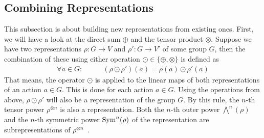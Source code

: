 \subsection{Combining Representations}

This subsection is about building new representations from existing ones.
First, we will have a look at the direct sum $\oplus$ and the tensor product $\otimes$.
Suppose we have two representations $\rho: G \to V$ and $\rho': G \to V'$ of some group $G$, then the combination of these using either operation $\odot \in \{\oplus, \otimes\}$ is defined as
\begin{align*}
    \forall a \in G: \qquad & (\rho \odot \rho')(a) = \rho(a) \odot \rho'(a)
\end{align*}
That means, the operator $\odot$ is applied to the linear maps of both representations of an action $a \in G$.
This is done for each action $a \in G$.
Using the operations from above, $\rho \odot \rho'$ will also be a representation of the group $G$.
By this rule, the $n$-th tensor power $\rho^{\otimes n}$ is also a representation.
Both the $n$-th outer power $\bigwedge^n(\rho)$ and the $n$-th symmetric power $\operatorname{Sym}^n(\rho)$ of the representation are subrepresentations of $\rho^{\otimes n}$~\cite{fulton2013}.

